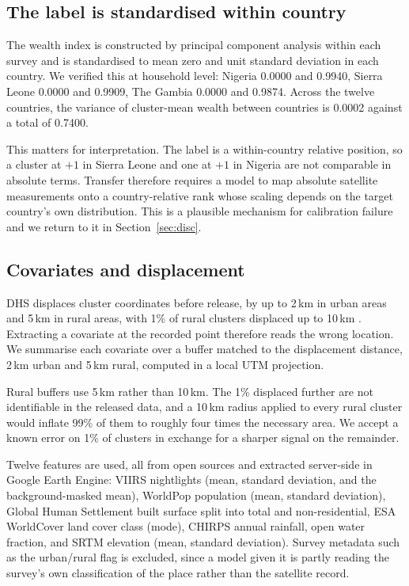 \documentclass[11pt]{article}
\begin{document}
\subsection{The label is standardised within country}

The wealth index is constructed by principal component analysis within each
survey and is standardised to mean zero and unit standard deviation in each
country. We verified this at household level: Nigeria 0.0000 and 0.9940, Sierra
Leone 0.0000 and 0.9909, The Gambia 0.0000 and 0.9874. Across the twelve
countries, the variance of cluster-mean wealth between countries is 0.0002
against a total of 0.7400.

This matters for interpretation. The label is a within-country relative
position, so a cluster at $+1$ in Sierra Leone and one at $+1$ in Nigeria are
not comparable in absolute terms. Transfer therefore requires a model to map
absolute satellite measurements onto a country-relative rank whose scaling
depends on the target country's own distribution. This is a plausible mechanism
for calibration failure and we return to it in Section~\ref{sec:disc}.

\subsection{Covariates and displacement}

DHS displaces cluster coordinates before release, by up to 2\,km in urban areas
and 5\,km in rural areas, with 1\% of rural clusters displaced up to 10\,km
\citep{burgert2013}.
Extracting a covariate at the recorded point therefore reads the wrong location.
We summarise each covariate over a buffer matched to the displacement distance,
2\,km urban and 5\,km rural, computed in a local UTM projection.

Rural buffers use 5\,km rather than 10\,km. The 1\% displaced further are not
identifiable in the released data, and a 10\,km radius applied to every rural
cluster would inflate 99\% of them to roughly four times the necessary area. We
accept a known error on 1\% of clusters in exchange for a sharper signal on the
remainder.

Twelve features are used, all from open sources and extracted server-side in
Google Earth Engine: VIIRS nightlights (mean, standard deviation, and the
background-masked mean), WorldPop population (mean, standard deviation), Global
Human Settlement built surface split into total and non-residential, ESA
WorldCover land cover class (mode), CHIRPS annual rainfall, open water fraction,
and SRTM elevation (mean, standard deviation). Survey metadata such as the
urban/rural flag is excluded, since a model given it is partly reading the
survey's own classification of the place rather than the satellite record.
\end{document}
